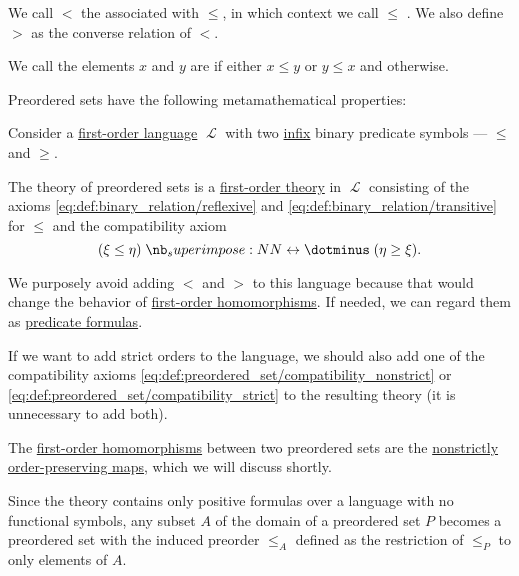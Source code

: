 \begin{definition}
\begin{thmenum}[series=def:preordered_set]
    We call \( < \) the  associated with \( \leq \), in which context we call \( \leq \) . We also define \( > \) as the converse relation of \( < \).

     We call the elements \( x \) and \( y \) are  if either \( x \leq y \) or \( y \leq x \) and  otherwise.
  \end{thmenum}

  Preordered sets have the following metamathematical properties:
  \begin{thmenum}[resume=def:preordered_set]
     Consider a \hyperref[def:first_order_language]{first-order language} \( \mscrL \) with two \hyperref[rem:first_order_formula_conventions/infix]{infix} binary predicate symbols --- \( \leq \) and \( \geq \).

    The theory of preordered sets is a \hyperref[def:first_order_theory]{first-order theory} in \( \mscrL \) consisting of the axioms \eqref{eq:def:binary_relation/reflexive} and \eqref{eq:def:binary_relation/transitive} for \( \leq \) and the compatibility axiom
    \begin{equation}\label{eq:def:preordered_set/theory}
      (\xi \leq \eta) \syniff (\eta \geq \xi).
    \end{equation}

    We purposely avoid adding \( < \) and \( > \) to this language because that would change the behavior of \hyperref[def:first_order_homomorphism]{first-order homomorphisms}. If needed, we can regard them as \hyperref[con:predicate_formula]{predicate formulas}.

    If we want to add strict orders to the language, we should also add one of the compatibility axioms \eqref{eq:def:preordered_set/compatibility_nonstrict} or \eqref{eq:def:preordered_set/compatibility_strict} to the resulting theory (it is unnecessary to add both).

     The \hyperref[def:first_order_homomorphism]{first-order homomorphisms} between two preordered sets are the \hyperref[def:order_function/preserving]{nonstrictly order-preserving maps}, which we will discuss shortly.

     Since the theory contains only positive formulas over a language with no functional symbols, any subset \( A \) of the domain of a preordered set \( P \) becomes a preordered set with the induced preorder \( \leq_A \) defined as the restriction of \( \leq_P \) to only elements of \( A \).


\end{thmenum}
\end{definition}
